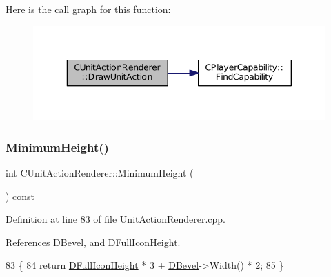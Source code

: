 Here is the call graph for this function\+:\nopagebreak
\begin{figure}[H]
\begin{center}
\leavevmode
\includegraphics[width=343pt]{classCUnitActionRenderer_aef690a560f7dca2c2cf9051eb4f8d71f_cgraph}
\end{center}
\end{figure}
\hypertarget{classCUnitActionRenderer_aeec570f80477cd6a3d2ec832e686f442}{}\label{classCUnitActionRenderer_aeec570f80477cd6a3d2ec832e686f442} 
\subsubsection{\texorpdfstring{Minimum\+Height()}{MinimumHeight()}}
{\footnotesize\ttfamily int C\+Unit\+Action\+Renderer\+::\+Minimum\+Height (\begin{DoxyParamCaption}{ }\end{DoxyParamCaption}) const}



Definition at line 83 of file Unit\+Action\+Renderer.\+cpp.



References D\+Bevel, and D\+Full\+Icon\+Height.


\begin{DoxyCode}
83                                             \{
84     \textcolor{keywordflow}{return} \hyperlink{classCUnitActionRenderer_a11b30763b92ed0cbfb842f86fe76fe26}{DFullIconHeight} * 3 + \hyperlink{classCUnitActionRenderer_a3f4012557f7f4d71cfa02df725984ebb}{DBevel}->Width() * 2;
85 \}
\end{DoxyCode}
\hypertarget{classCUnitActionRenderer_ad2d078b041fce9c34264f4670a60c7a3}{}\label{classCUnitActionRenderer_ad2d078b041fce9c34264f4670a60c7a3} 
